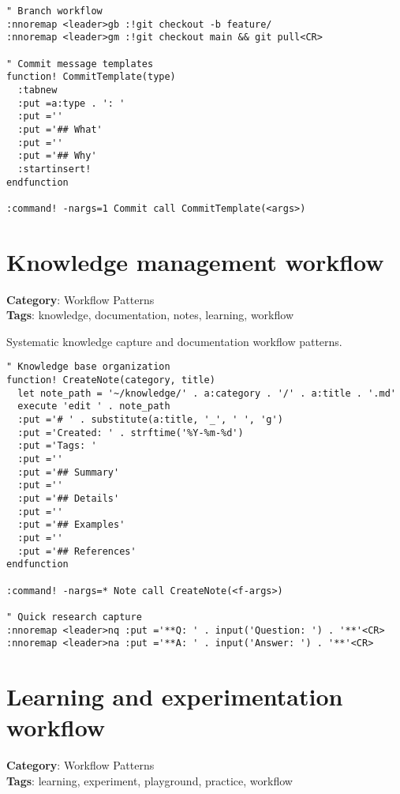 {{{{{{{{{{{{{{{{{{\begin{Exa*}{}
\begin{Verbatim}[fontsize=\footnotesize, breaklines, breakanywhere]
" Branch workflow
:nnoremap <leader>gb :!git checkout -b feature/
:nnoremap <leader>gm :!git checkout main && git pull<CR>

" Commit message templates
function! CommitTemplate(type)
  :tabnew
  :put =a:type . ': '
  :put =''
  :put ='## What'
  :put =''
  :put ='## Why'
  :startinsert!
endfunction

:command! -nargs=1 Commit call CommitTemplate(<args>)
\end{Verbatim}
\end{Exa*}

\section{Knowledge management workflow}

\textbf{Category}: Workflow Patterns\\ \textbf{Tags}: knowledge, documentation, notes, learning, workflow
\vspace{0.5cm}

Systematic knowledge capture and documentation workflow patterns.

\begin{Exa*}{}
\begin{Verbatim}[fontsize=\footnotesize, breaklines, breakanywhere]
" Knowledge base organization
function! CreateNote(category, title)
  let note_path = '~/knowledge/' . a:category . '/' . a:title . '.md'
  execute 'edit ' . note_path
  :put ='# ' . substitute(a:title, '_', ' ', 'g')
  :put ='Created: ' . strftime('%Y-%m-%d')
  :put ='Tags: '
  :put =''
  :put ='## Summary'
  :put =''
  :put ='## Details'
  :put =''
  :put ='## Examples'
  :put =''
  :put ='## References'
endfunction

:command! -nargs=* Note call CreateNote(<f-args>)

" Quick research capture
:nnoremap <leader>nq :put ='**Q: ' . input('Question: ') . '**'<CR>
:nnoremap <leader>na :put ='**A: ' . input('Answer: ') . '**'<CR>
\end{Verbatim}
\end{Exa*}

\section{Learning and experimentation workflow}

\textbf{Category}: Workflow Patterns\\ \textbf{Tags}: learning, experiment, playground, practice, workflow
\vspace{0.5cm}

}}}}}}}}}}}}}}}}}}
